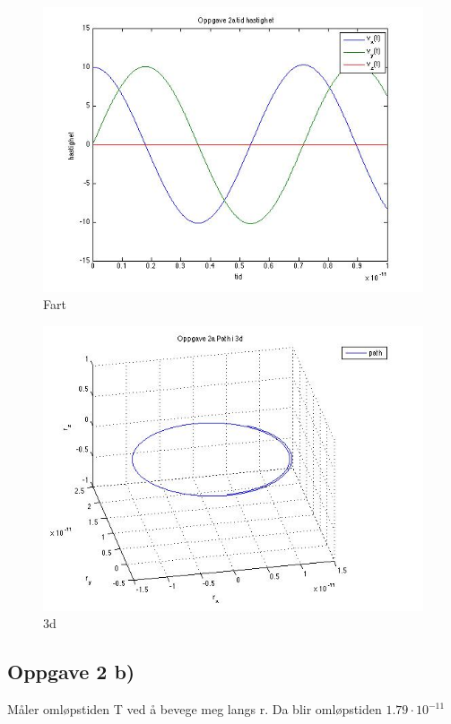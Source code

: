 \documentclass[12pt,a4paper,final,leqno]{report}
\begin{document}
\begin{figure}[H]
\caption{Fart}
\centering
\includegraphics[width=\textwidth]{oppgave2vt.jpg}
\end{figure}

\begin{figure}[H]
\caption{3d}
\centering
\includegraphics[width=\textwidth]{oppgave23d.jpg}
\end{figure}

\subsection*{Oppgave 2 b)}
Måler omløpstiden T ved å bevege meg langs r. Da blir omløpstiden $1.79\cdot10^{-11}$
\end{document}
